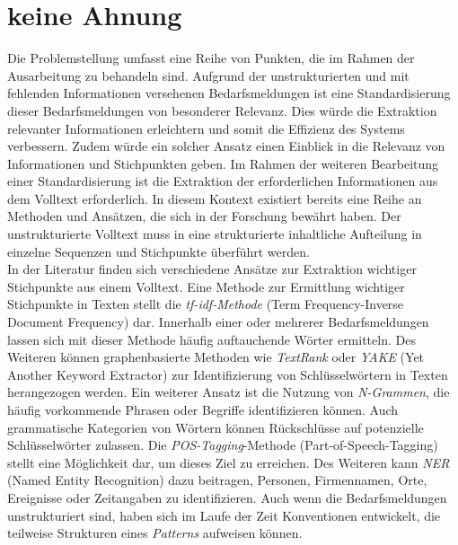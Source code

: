 \section{keine Ahnung}
Die Problemstellung umfasst eine Reihe von Punkten, die im Rahmen der Ausarbeitung zu behandeln sind. Aufgrund der unstrukturierten und mit fehlenden Informationen versehenen Bedarfsmeldungen ist eine Standardisierung dieser Bedarfsmeldungen von besonderer Relevanz. Dies würde die Extraktion relevanter Informationen erleichtern und somit die Effizienz des Systems verbessern. Zudem würde ein solcher Ansatz einen Einblick in die Relevanz von Informationen und Stichpunkten geben. Im Rahmen der weiteren Bearbeitung einer Standardisierung ist die Extraktion der erforderlichen Informationen aus dem Volltext erforderlich. In diesem Kontext existiert bereits eine Reihe an Methoden und Ansätzen, die sich in der Forschung bewährt haben. Der unstrukturierte Volltext muss in eine strukturierte inhaltliche Aufteilung in einzelne Sequenzen und Stichpunkte überführt werden.\\

In der Literatur finden sich verschiedene Ansätze zur Extraktion wichtiger Stichpunkte aus einem Volltext. Eine Methode zur Ermittlung wichtiger Stichpunkte in Texten stellt die \emph{tf-idf-Methode} (Term Frequency-Inverse Document Frequency) dar. Innerhalb einer oder mehrerer Bedarfsmeldungen lassen sich mit dieser Methode häufig auftauchende Wörter ermitteln. Des Weiteren können graphenbasierte Methoden wie \emph{TextRank} oder \emph{YAKE} (Yet Another Keyword Extractor) zur Identifizierung von Schlüsselwörtern in Texten herangezogen werden. Ein weiterer Ansatz ist die Nutzung von \emph{N-Grammen}, die häufig vorkommende Phrasen oder Begriffe identifizieren können. Auch grammatische Kategorien von Wörtern können Rückschlüsse auf potenzielle Schlüsselwörter zulassen. Die \emph{POS-Tagging}-Methode (Part-of-Speech-Tagging) stellt eine Möglichkeit dar, um dieses Ziel zu erreichen. Des Weiteren kann \emph{NER} (Named Entity Recognition) dazu beitragen, Personen, Firmennamen, Orte, Ereignisse oder Zeitangaben zu identifizieren. Auch wenn die Bedarfsmeldungen unstrukturiert sind, haben sich im Laufe der Zeit Konventionen entwickelt, die teilweise Strukturen eines \emph{Patterns} aufweisen können.